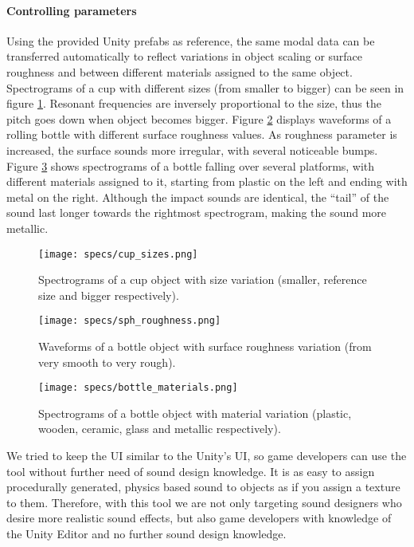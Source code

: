\paragraph{Controlling parameters\\}
Using the provided Unity\textsuperscript{\textregistered} prefabs as reference, the same modal data can be transferred automatically to reflect variations in object scaling or surface roughness and between different materials assigned to the same object. Spectrograms of a cup with different sizes (from smaller to bigger) can be seen in figure \ref{fig:cup_sizes}. Resonant frequencies are inversely proportional to the size, thus the pitch goes down when object becomes bigger. Figure \ref{fig:bottle_rough} displays waveforms of a rolling bottle with different surface roughness values. As roughness parameter is increased, the surface sounds more irregular, with several noticeable bumps. Figure \ref{fig:bottle_materials} shows spectrograms of a bottle falling over several platforms, with different materials assigned to it, starting from plastic on the left and ending with metal on the right. Although the impact sounds are identical, the ``tail'' of the sound last longer towards the rightmost spectrogram, making the sound more metallic.

\begin{figure}[H]
  \centering
    \texttt{[image: specs/cup\_sizes.png]}
      \caption{Spectrograms of a cup object with size variation (smaller, reference size and bigger respectively).}
      \label{fig:cup_sizes}
\end{figure}

\begin{figure}[H]
  \centering
    \texttt{[image: specs/sph\_roughness.png]}
      \caption{Waveforms of a bottle object with surface roughness variation (from very smooth to very rough).}
      \label{fig:bottle_rough}
\end{figure}

\begin{figure}[H]
  \centering
    \texttt{[image: specs/bottle\_materials.png]}
      \caption{Spectrograms of a bottle object with material variation (plastic, wooden, ceramic, glass and metallic respectively).}
      \label{fig:bottle_materials}
\end{figure}

We tried to keep the \gls{UI} similar to the Unity\textsuperscript{\textregistered}'s \gls{UI}, so game developers can use the tool without further need of sound design knowledge. It is as easy to assign procedurally generated, physics based sound to objects as if you assign a texture to them. Therefore, with this tool we are not only targeting sound designers who desire more realistic sound effects, but also game developers with knowledge of the Unity\textsuperscript{\textregistered} Editor and no further sound design knowledge. 


